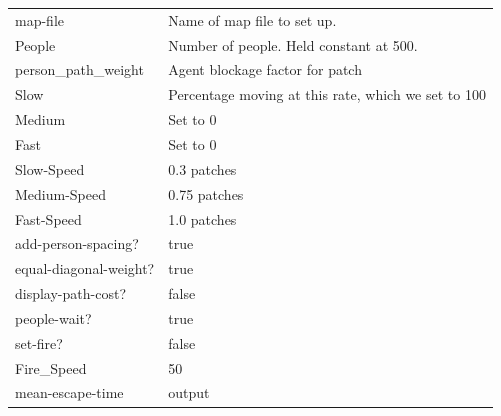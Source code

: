 \documentclass[12pt,letterpaper]{article}
\begin{document}
\begin{tabular}{ l | l }
map-file & Name of map file to set up. \\
People & Number  of people. Held constant at 500. \\
person\_path\_weight & Agent blockage factor for patch \\
Slow & Percentage moving at this rate, which we set to 100 \\
Medium & Set to 0 \\
Fast & Set to 0 \\
Slow-Speed & 0.3 patches \\
Medium-Speed & 0.75 patches \\
Fast-Speed & 1.0 patches \\
add-person-spacing? & true \\
equal-diagonal-weight? & true \\
display-path-cost? & false \\
people-wait? & true \\
set-fire? & false \\
Fire\_Speed & 50 \\
mean-escape-time & output \\
\end{tabular}
\end{document}
